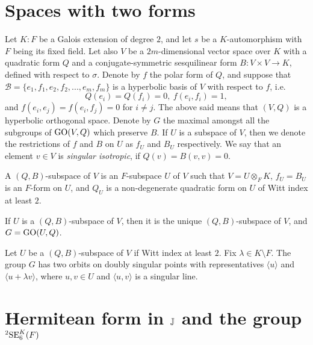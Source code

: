 
\section{Spaces with two forms}

Let $K : F$ be a Galois extension of degree $2$, 
and let $s$ be a $K$-automorphism
with $F$ being its fixed field. Let also $V$ be a $2m$-dimensional vector space over $K$ with 
a quadratic form $Q$ and a conjugate-symmetric sesquilinear form 
\mbox{$B : V\times V \rightarrow K$},
defined with respect to $\sigma$. Denote by $f$ the polar form of $Q$, and suppose that 
\mbox{$\mathcal{B} = \{ e_1, f_1, e_2, f_2, ..., e_m, f_m \}$}
is a hyperbolic basis of $V$ with respect to $f$, i.e.
\begin{equation}
	Q(e_i) = Q(f_i) = 0,\ f(e_i, f_i) = 1,
\end{equation}
and $f(e_i,e_j) = f(e_i,f_j) = 0$ for $i \neq j$. The above said means that $(V,Q)$ is a hyperbolic
orthogonal space. Denote by $G$ the maximal amongst all the subgroups of 
$\mathrm{GO}(V, Q)$ which preserve $B$. If $U$ 
is a subspace of $V$, then we denote the restrictions of $f$ and $B$ on $U$ as $f_U$ and $B_U$ 
respectively. We say that an element $v \in V$ is \textit{singular isotropic}, if $Q(v) = B(v,v) = 0$. 

\begin{definition}
	A $(Q,B)$-subspace of $V$ is an $F$-subspace $U$ of $V$ such that \mbox{$V = U \otimes_F K$}, 
	$f_U = B_U$ is an $F$-form on $U$, and $Q_U$ is a non-degenerate quadratic form on $U$ of 
	Witt index at least $2$. 
\end{definition}

\begin{proposition}
	\label{prop:3_2forms}
	If $U$ is a $(Q,B)$-subspace of $V$, then it is the unique $(Q,B)$-subspace of $V$, and
	$G = \mathrm{GO}(U,Q)$. 
\end{proposition}

\begin{proposition}
	\label{prop:3_2forms_orbits}
	Let $U$ be a $(Q,B)$-subspace of $V$ if Witt index at least $2$. Fix $\lambda \in K 
	\setminus F$. The group $G$ has two orbits on doubly singular points with representatives
	$\langle u \rangle$ and $\langle u + \lambda v \rangle$, where $u,v \in U$ and 
	$\langle u, v \rangle$ 	is a singular line. 
\end{proposition}

\section{Hermitean form in $\mathbb{J}$ and the group ${}^2\mathrm{SE}_6^K(F)$}

